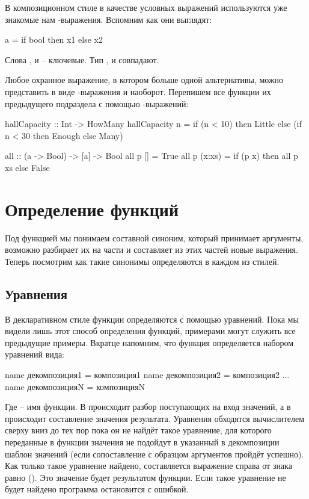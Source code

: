 В композиционном стиле в качестве условных выражений используются уже
знакомые нам -выражения. Вспомним как они выглядят:


\begin{code}
a = if bool 
    then x1
    else x2
\end{code}

Слова ,  и  -- ключевые. Тип ,  и
 совпадают.

Любое охранное выражение, в котором больше одной альтернативы, можно
представить в виде -выражения и наоборот. Перепишем все функции
их предыдущего подраздела с помощью -выражений:


\begin{code}
hallCapacity :: Int -> HowMany
hallCapacity n =
    if (n < 10)
    then Little
    else (if n < 30 
          then Enough
          else Many)

all :: (a -> Bool) -> [a] -> Bool
all p []     = True
all p (x:xs) = if (p x) then all p xs else False
\end{code}

\section{Определение функций}

Под функцией мы понимаем составной синоним, который принимает аргументы,
возможно разбирает их на части и составляет из этих частей новые
выражения. Теперь посмотрим как такие синонимы определяются в каждом из
стилей.

\subsection{Уравнения}

В декларативном стиле функции определяются с помощью уравнений. Пока мы
видели лишь этот способ определения функций, примерами могут служить все
предыдущие примеры. Вкратце напомним, что функция определяется набором
уравнений вида:


\begin{code}
name декомпозиция1 = композиция1
name декомпозиция2 = композиция2
...
name декомпозицияN = композицияN
\end{code}

Где  -- имя функции. В  происходит разбор
поступающих на вход значений, а в  происходит составление
значения результата. Уравнения обходятся вычислителем сверху вниз до тех
пор пока он не найдёт такое уравнение, для которого переданные в функции
значения не подойдут в указанный в декомпозиции шаблон значений (если
сопоставление с образцом аргументов пройдёт успешно). Как только такое
уравнение найдено, составляется выражение справа от знака равно
(). Это значение будет результатом функции. Если такое
уравнение не будет найдено программа остановится с ошибкой.

